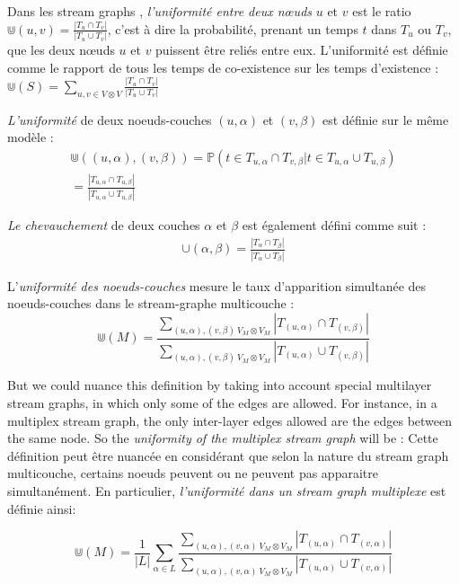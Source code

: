 \documentclass[11pt,a4paper]{article}
\theoremstyle{definition}
\theoremstyle{remark}
\theoremstyle{remark}
\begin{document}
	Dans les stream graphs \cite{stream}, {\em l'uniformité entre deux nœuds} $u$ et $v$ est le ratio $\Cup (u,v) = \frac{|T_u\cap T_v|}{|T_u \cup T_v|}$, c'est à dire la probabilité, prenant un temps $t$ dans $T_u$ ou $T_v$, que les deux nœuds $u$ et $v$ puissent être reliés entre eux. L'uniformité est définie comme le rapport de tous les temps de co-existence sur les temps d'existence : $
 \Cup(S)=\sum_{u,v \in V \otimes V}\frac{|T_u\cap T_v|}{|T_u\cup T_v|}
$
	
		
	{\em L'uniformité } de deux noeuds-couches $(u,\alpha)$ et $(v,\beta)$ est définie sur le même modèle :
	\begin{align*}
		\Cup((u,\alpha),(v,\beta))=\mathbb{P}( t \in T_{u,\alpha} \cap T_{v,\beta} | t \in T_{u,\alpha} \cup T_{u,\beta}) \\
		= \frac{|T_{u,\alpha}\cap T_{u,\beta}|}{|T_{u,\alpha}\cup T_{u,\beta}|}
	\end{align*}

	{\em Le chevauchement} de deux couches $\alpha$ et $\beta$ est également défini comme suit :
	\begin{align*}
		\cup(\alpha,\beta) = \frac{|T_{\alpha}\cap T_{\beta}|}{|T_{\alpha}\cup T_{\beta}|}
	\end{align*}

    L'{\em uniformité des noeuds-couches} mesure le taux d'apparition simultanée des noeuds-couches dans le stream-graphe multicouche :
    \[
    	\Cup(M) = \frac{\sum_{(u,\alpha),(v,\beta) \ V_M \otimes V_M}{|T_{(u,\alpha)} \cap T_{(v,\beta)}|}}{\sum_{(u,\alpha),(v,\beta) \ V_M \otimes V_M}{|T_{(u,\alpha)}\cup T_{(v,\beta)}|}}
    \]
	
	But we could nuance this definition by taking into account special multilayer stream graphs, in which only some of the edges are allowed. For instance, in a multiplex stream graph, the only inter-layer edges allowed are the edges between the same node. So the {\em uniformity of the multiplex stream graph} will be :
	Cette définition peut être nuancée en considérant que selon la nature du stream graph multicouche, certains noeuds peuvent ou ne peuvent pas apparaitre simultanément. En particulier, {\em l'uniformité dans un stream graph multiplexe} est définie ainsi:	
	
	\[
    	\Cup(M) = \frac{1}{|L|}\sum_{\alpha \in L} \frac{\sum_{(u,\alpha),(v,\alpha) \ V_M \otimes V_M}{|T_{(u,\alpha)} \cap T_{(v,\alpha)}|}}{\sum_{(u,\alpha),(v,\alpha) \ V_M \otimes V_M}{|T_{(u,\alpha)}\cup T_{(v,\alpha)}|}}
    \]
    
\end{document}
